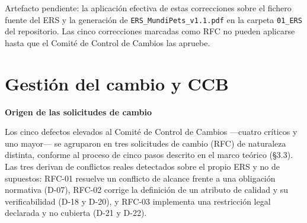 \documentclass[journal,onecolumn]{IEEEtran}
\begin{document}
	Artefacto pendiente: la aplicación efectiva de estas correcciones
	sobre el fichero fuente del ERS y la generación de
	\texttt{ERS\_MundiPets\_v1.1.pdf} en la carpeta \texttt{01\_ERS} del
	repositorio. Las cinco correcciones marcadas como RFC no pueden aplicarse
	hasta que el Comité de Control de Cambios las apruebe.
	
	\newpage
	
	
	\section{Gestión del cambio y CCB}
	
	\textbf{Origen de las solicitudes de cambio}
	
	Los cinco defectos elevados al Comité de Control de Cambios —cuatro
	críticos y uno mayor— se agruparon en tres solicitudes de cambio (RFC) de
	naturaleza distinta, conforme al proceso de cinco pasos descrito en el
	marco teórico (\S3.3). Las tres derivan de conflictos reales detectados
	sobre el propio ERS y no de supuestos: RFC-01 resuelve un conflicto de
	alcance frente a una obligación normativa (D-07), RFC-02 corrige la
	definición de un atributo de calidad y su verificabilidad (D-18 y D-20), y
	RFC-03 implementa una restricción legal declarada y no cubierta (D-21 y
	D-22).
	
\end{document}
